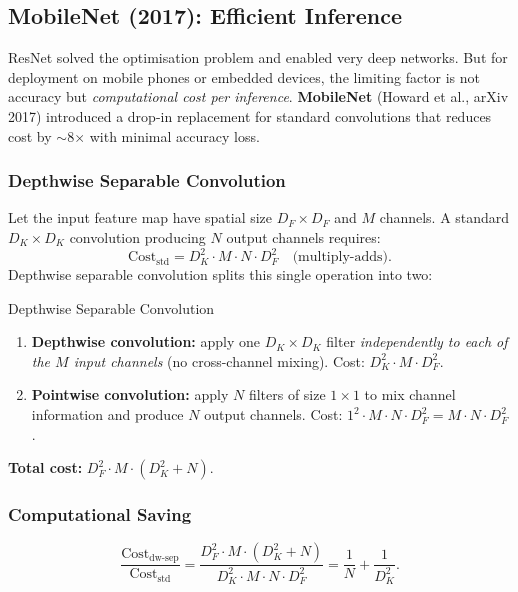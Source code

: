 \documentclass[11pt,a4paper]{article}
\newcommand{\term}[1]{\textcolor{DefGreen}{\textbf{#1}}\index{#1}}
\begin{document}
\subsection{MobileNet (2017): Efficient Inference}
\label{sec:mobilenet}

ResNet solved the optimisation problem and enabled very deep networks.  But for deployment on
mobile phones or embedded devices, the limiting factor is not accuracy but \emph{computational
cost per inference}.  \term{MobileNet} (Howard et al., arXiv 2017) introduced a drop-in
replacement for standard convolutions that reduces cost by $\sim$8$\times$ with minimal accuracy
loss.

\subsubsection{Depthwise Separable Convolution}

Let the input feature map have spatial size $D_F \times D_F$ and $M$ channels.  A standard
$D_K \times D_K$ convolution producing $N$ output channels requires:
\[
  \text{Cost}_{\text{std}} = D_K^2 \cdot M \cdot N \cdot D_F^2 \quad \text{(multiply-adds)}.
\]
Depthwise separable convolution splits this single operation into two:

\begin{defbox}{Depthwise Separable Convolution}
\begin{enumerate}
  \item \textbf{Depthwise convolution:} apply one $D_K \times D_K$ filter
    \emph{independently to each of the $M$ input channels} (no cross-channel mixing).
    Cost: $D_K^2 \cdot M \cdot D_F^2$.
  \item \textbf{Pointwise convolution:} apply $N$ filters of size $1\times1$ to mix
    channel information and produce $N$ output channels.
    Cost: $1^2 \cdot M \cdot N \cdot D_F^2 = M \cdot N \cdot D_F^2$.
\end{enumerate}
\textbf{Total cost:} $D_F^2 \cdot M \cdot (D_K^2 + N)$.
\end{defbox}

\subsubsection{Computational Saving}

\[
\frac{\text{Cost}_{\text{dw-sep}}}{\text{Cost}_{\text{std}}}
= \frac{D_F^2 \cdot M \cdot (D_K^2 + N)}{D_K^2 \cdot M \cdot N \cdot D_F^2}
= \frac{1}{N} + \frac{1}{D_K^2}.
\]
\end{document}
